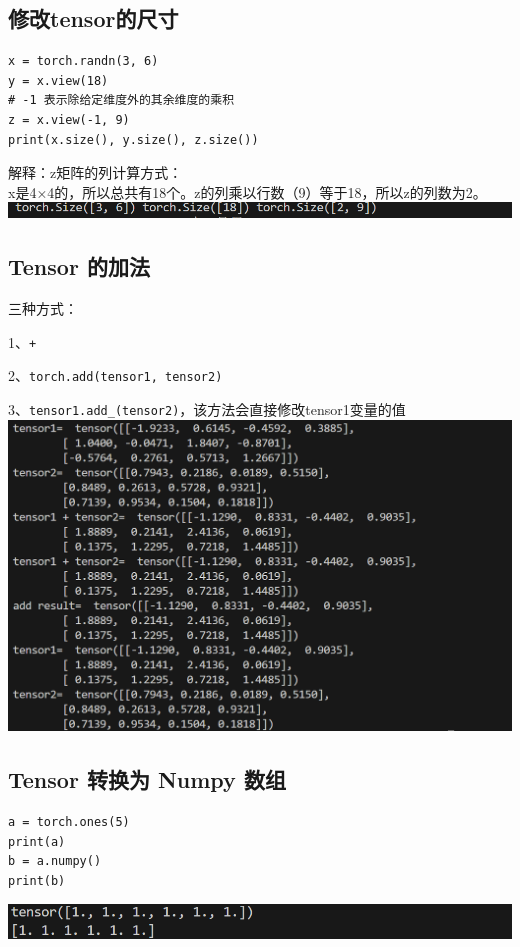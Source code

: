 \documentclass[UTF8,a4paper]{ctexart}
\begin{document}
\subsection{修改tensor的尺寸}
\begin{lstlisting}
x = torch.randn(3, 6)
y = x.view(18)
# -1 表示除给定维度外的其余维度的乘积
z = x.view(-1, 9)
print(x.size(), y.size(), z.size())
\end{lstlisting}
解释：z矩阵的列计算方式：\\
x是4×4的，所以总共有18个。z的列乘以行数（9）等于18，所以z的列数为2。
\includegraphics[width=1\textwidth]{./pictures/tensor4.png}

\subsection{Tensor 的加法}
三种方式：\par
1、\verb|+|\par
2、\verb|torch.add(tensor1, tensor2)|\par
3、\verb|tensor1.add_(tensor2)|，该方法会直接修改tensor1变量的值\\
\includegraphics[width=1\textwidth]{./pictures/加法.png}

\subsection{Tensor 转换为 Numpy 数组}
\begin{lstlisting}
a = torch.ones(5)
print(a)
b = a.numpy()
print(b)
\end{lstlisting}
\includegraphics[width=1\textwidth]{./pictures/tensor5.png}
\end{document}

